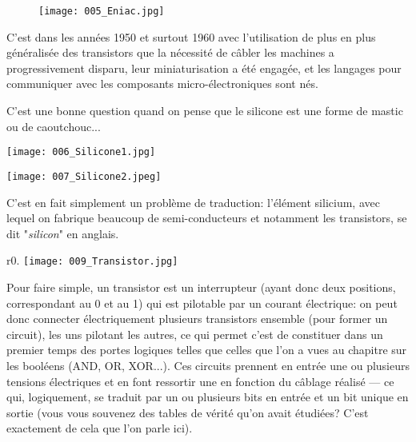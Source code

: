 \documentclass[12pt]{article}
\begin{document}
	 \begin{figure}[H]
	 	\centering
	 	\texttt{[image: 005\_Eniac.jpg]}
	 \end{figure}
	 
	 C'est dans les années 1950 et surtout 1960 avec l'utilisation de plus en plus généralisée des transistors que la nécessité de câbler les machines a progressivement disparu, leur miniaturisation a été engagée, et les langages pour communiquer avec les composants micro-électroniques sont nés.
	 
	 
	 \begin{MaReponse}
	 	C'est une bonne question quand on pense que le silicone est une forme de mastic ou de caoutchouc...
	 	
	 	\noindent
	 	\begin{minipage}{0.5\textwidth}
	 		\centering
	 		\texttt{[image: 006\_Silicone1.jpg]}
	 	\end{minipage}%
	 	\begin{minipage}{0.5\textwidth}
	 		\centering
	 		\texttt{[image: 007\_Silicone2.jpeg]}
	 	\end{minipage}
	 	
	 	C'est en fait simplement un problème de traduction: l'élément silicium, avec lequel on fabrique beaucoup de semi-conducteurs et notamment les transistors, se dit "\textit{silicon}" en anglais.
	\end{MaReponse}
	
	\begin{wrapfigure}{r}{0.\textwidth}
		\texttt{[image: 009\_Transistor.jpg]}
	\end{wrapfigure}
	Pour faire simple, un transistor est un interrupteur (ayant donc deux positions, correspondant au 0 et au 1) qui est pilotable par un courant électrique: on peut donc connecter électriquement plusieurs transistors ensemble (pour former un circuit), les uns pilotant les autres, ce qui permet c'est de constituer dans un premier temps des portes logiques telles que celles que l'on a vues au chapitre sur les booléens (AND, OR, XOR...). Ces circuits prennent en entrée une ou plusieurs tensions électriques et en font ressortir une en fonction du câblage réalisé --- ce qui, logiquement, se traduit par un ou plusieurs bits en entrée et un bit unique en sortie (vous vous souvenez des tables de vérité qu'on avait étudiées? C'est exactement de cela que l'on parle ici).
	
\end{document}
